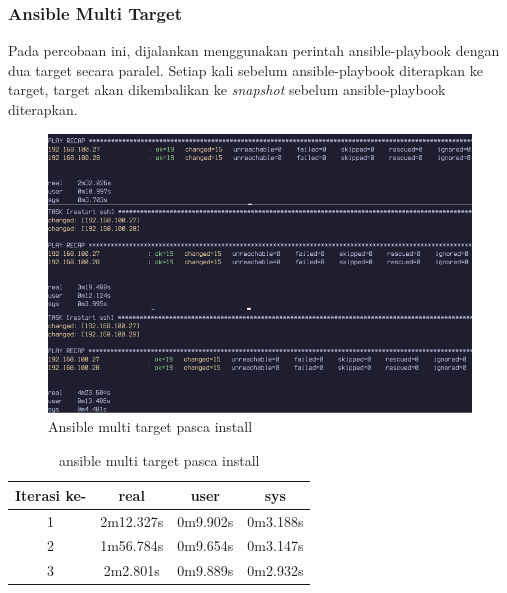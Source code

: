 \documentclass[10pt,twoside]{report}
\begin{document}
\begin{adjustwidth}{20pt}{}
	\subsubsection{Ansible Multi Target}
	\begin{adjustwidth}{20pt}{}
		Pada percobaan ini, dijalankan menggunakan perintah ansible-playbook dengan dua
		target secara paralel. Setiap kali sebelum ansible-playbook diterapkan ke target,
		target akan dikembalikan ke \textit{snapshot} sebelum ansible-playbook diterapkan.
		\begin{figure}[H]
			\begin{center}
				\includegraphics[width=\textwidth]{images/ansible/multi/ansible-pasca-multi-com.png}
			\end{center}
			\caption{Ansible multi target pasca install}
		\end{figure}
		\begin{table}[H]
			\caption{ansible multi target pasca install}
			\begin{center}
				\begin{tabular}[c]{|c|c|c|c|}
					\hline
					\multicolumn{1}{|c|}{\textbf{Iterasi ke-}} &
					\multicolumn{1}{c|}{\textbf{real}}         &
					\multicolumn{1}{c|}{\textbf{user}}         &
					\multicolumn{1}{c|}{\textbf{sys}}                                            \\
					\hline
					1                                          & 2m12.327s & 0m9.902s & 0m3.188s \\
					\hline
					2                                          & 1m56.784s & 0m9.654s & 0m3.147s \\
					\hline
					3                                          & 2m2.801s  & 0m9.889s & 0m2.932s \\
					\hline
				\end{tabular}
			\end{center}
		\end{table}
	\end{adjustwidth}

\end{adjustwidth}
\end{document}
